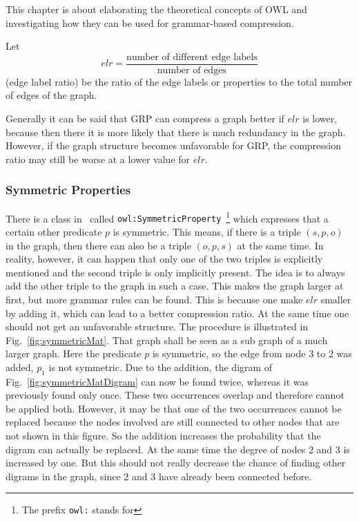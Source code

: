 This chapter is about elaborating the theoretical concepts of OWL and investigating how they can be used for grammar-based compression.

Let \[ elr = \dfrac{\text{number of different edge labels}}{\text{number of edges}} \] (edge label ratio) be the ratio of the edge labels or properties to the total number of edges of the graph. 

Generally it can be said that GRP can compress a graph better if $elr$ is lower, because then there it is more likely that there is much redundancy in the graph. However, if the graph structure becomes unfavorable for GRP, the compression ratio may still be worse at a lower value for $elr$.


\subsubsection{Symmetric Properties}


There is a class in~\cite{owl} called {\tt owl:SymmetricProperty}~\footnote{The prefix {\tt owl:} stands for} which expresses that a certain other predicate $p$ is symmetric. This means, if there is a triple $(s,p,o)$ in the graph, then there can also be a triple $(o,p,s)$ at the same time. In reality, however, it can happen that only one of the two triples is explicitly mentioned and the second triple is only implicitly present. The idea is to always add the other triple to the graph in such a case. This makes the graph larger at first, but more grammar rules can be found. This is because one make $elr$ smaller by adding it, which can lead to a better compression ratio. At the same time one should not get an unfavorable structure. The procedure is illustrated in Fig.~\ref{fig:symmetricMat}. That graph shall be seen as a sub graph of a much larger graph. Here the predicate $p$ is symmetric, so the edge from node 3 to 2 was added, $p_1$ is not symmetric. Due to the addition, the digram of Fig.~\ref{fig:symmetricMatDigram} can now be found twice, whereas it was previously found only once. These two occurrences overlap and therefore cannot be applied both. However, it may be that one of the two occurrences cannot be replaced because the nodes involved are still connected to other nodes that are not shown in this figure. So the addition increases the probability that the digram can actually be replaced. At the same time the degree of nodes 2 and 3 is increased by one. But this should not really decrease the chance of finding other digrams in the graph, since 2 and 3 have already been connected before.


